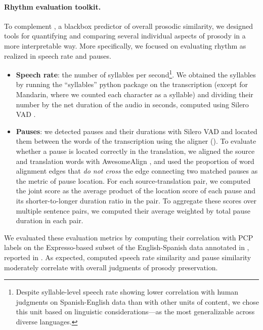 \paragraph{Rhythm evaluation toolkit.}
\label{sec:local-prosody-tools}
To complement \comparator, a blackbox predictor of overall prosodic similarity, we designed tools for quantifying and comparing several individual aspects of prosody in a more interpretable way. More specifically, we focused on evaluating rhythm as realized in speech rate and pauses.
\begin{itemize}[noitemsep,nolistsep]
    \item \textbf{Speech rate}: the number of syllables per second\footnote{Despite syllable-level speech rate showing lower correlation with human judgments on Spanish-English data than with other units of content, we chose this unit based on linguistic considerations—as the most generalizable across diverse languages.}. We obtained the syllables by running the ``syllables'' python package on the transcription (except for Mandarin, where we counted each character as a syllable) and dividing their number by the net duration of the audio in seconds, computed using Silero VAD \citep{SileroVAD}.
    \item \textbf{Pauses}: we detected pauses and their durations with Silero VAD and located them between the words of the transcription using the \unitytwo aligner (). To evaluate whether a pause is located correctly in the translation, we aligned the source and translation words with AwesomeAlign \citep{dou2021awesomealign}, and used the proportion of word alignment edges that \textit{do not cross} the edge connecting two matched pauses as the metric of pause location. For each source-translation pair, we computed the joint score as the average product of the location score of each pause and its shorter-to-longer duration ratio in the pair. To aggregate these scores over multiple sentence pairs, we computed their average weighted by total pause duration in each pair.
\end{itemize}

We evaluated these evaluation metrics by computing their correlation with PCP labels on the Expresso-based subset of the English-Spanish data annotated in \cite{huang2023holistic}, reported in . As expected, computed speech rate similarity and pause similarity moderately correlate with overall judgments of prosody preservation.

